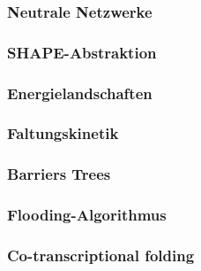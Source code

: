 \documentclass[12pt]{article}
\begin{document}
\subsubsection{Neutrale Netzwerke}

\subsubsection{SHAPE-Abstraktion}

\subsubsection{Energielandschaften}

\subsubsection{Faltungskinetik}

\subsubsection{Barriers Trees}

\subsubsection{Flooding-Algorithmus}

\subsubsection{Co-transcriptional folding}
\end{document}
